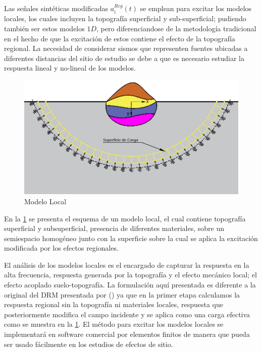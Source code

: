 \documentclass[spanish,letterpaper,12pt,twoside,openany]{article}
\begin{document}
Las señales sintéticas modificadas $a_{i}^{Reg}\left( t \right)$ se emplean para excitar los modelos locales, los cuales incluyen la topografía superficial y sub-superficial; pudiendo también ser estos modelos $1D$, pero diferenciandose de la metodología tradicional en el hecho de que la excitación de estos contiene el efecto de la topografía regional. La necesidad de considerar sismos que representen fuentes ubicadas a diferentes distancias del sitio de estudio se debe a que es necesario estudiar la respuesta lineal y no-lineal de los modelos.
%
\begin{figure}[H]
	\centering
	\includegraphics[width=12 cm]{img/Local.pdf}
	\vspace{-.5 cm}
	\caption{Modelo Local}
	\label{fig:local}
	\vspace{-1 cm}
\end{figure}
%
En la \cref{fig:local} se presenta el esquema de un modelo local, el cual contiene topografía superficial y subsuperficial, presencia de diferentes materiales, sobre un semiespacio homogéneo junto con la superficie sobre la cual se aplica la excitación modificada por los efectos regionales.

El análisis de los modelos locales es el encargado de capturar la respuesta en la alta frecuencia, respuesta generada por la topografía y el efecto mecánico local; el efecto acoplado suelo-topografía. La formulación aquí presentada es diferente a la original del DRM presentada por \citeauthor{bielak2003} (\citeyear{bielak2003}) ya que en la primer etapa calculamos la respuesta regional sin la topografía ni materiales locales, respuesta que posteriormente modifica el campo incidente y se aplica como una carga efectiva como se muestra en la \cref{fig:local}. El método para excitar los modelos locales se implementará en software comercial por elementos finitos de manera que pueda ser usado fácilmente en los estudios de efectos de sitio.
\end{document}
